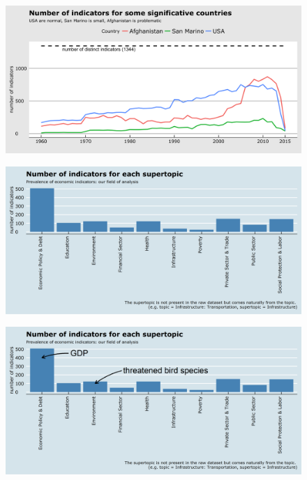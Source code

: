 \documentclass[10pt]{beamer}
\begin{document}
\begin{frame}
	\begin{figure}
		\centering
		\includegraphics[width=\textwidth]{plot0002.png}
	\end{figure}
\end{frame}

\begin{frame}
	\begin{figure}
		\centering
		\includegraphics[width=\textwidth]{plot0003.png}
	\end{figure}
\end{frame}

\begin{frame}
	\begin{figure}
		\centering
		\includegraphics[width=\textwidth]{plot0004.png}
	\end{figure}
\end{frame}
\end{document}
